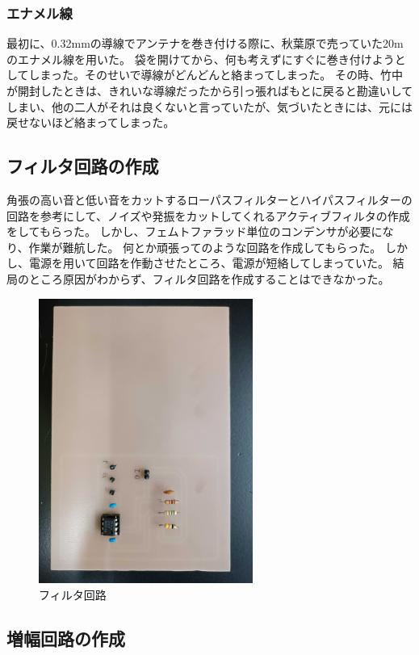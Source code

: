 \documentclass[report.tex]{subfiles}
\begin{document}
\subsubsection{エナメル線}

最初に、0.32mmの導線でアンテナを巻き付ける際に、秋葉原で売っていた20mのエナメル線を用いた。
袋を開けてから、何も考えずにすぐに巻き付けようとしてしまった。そのせいで導線がどんどんと絡まってしまった。
その時、竹中が開封したときは、きれいな導線だったから引っ張ればもとに戻ると勘違いしてしまい、他の二人がそれは良くないと言っていたが、気づいたときには、元には戻せないほど絡まってしまった。

\subsection{フィルタ回路の作成}

角張の高い音と低い音をカットするローパスフィルターとハイパスフィルターの回路を参考にして、ノイズや発振をカットしてくれるアクティブフィルタの作成をしてもらった。
しかし、フェムトファラッド単位のコンデンサが必要になり、作業が難航した。
何とか頑張ってのような回路を作成してもらった。
しかし、電源を用いて回路を作動させたところ、電源が短絡してしまっていた。
結局のところ原因がわからず、フィルタ回路を作成することはできなかった。

\begin{figure}[H]
	\centering
	\includegraphics[width=7cm]{use/1.jpg}
	\caption{フィルタ回路}
	\label{fig:filter}
\end{figure}

\subsection{増幅回路の作成}
\end{document}
